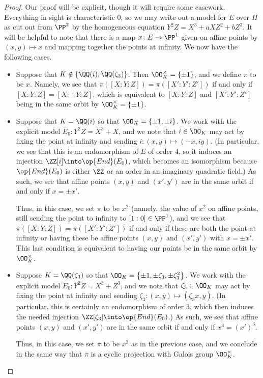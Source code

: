 \documentclass[../notes.tex]{subfiles}
\begin{document}
\begin{proof}
	Our proof will be explicit, though it will require some casework. Everything in sight is characteristic $0$, so we may write out a model for $E$ over $H$ as cut out from $\PP^2$ by the homogeneous equation $Y^2Z=X^3+aXZ^2+bZ^3$. It will be helpful to note that there is a map $x\colon E\to\PP^1$ given on affine points by $(x,y)\mapsto x$ and mapping together the points at infinity. We now have the following cases.
	\begin{itemize}
		\item Suppose that $K\notin\{\QQ(i),\QQ(\zeta_3)\}$. Then $\OO_K^\times=\{\pm1\}$, and we define $\pi$ to be $x$. Namely, we see that $\pi([X:Y:Z])=\pi([X':Y':Z'])$ if and only if $[X:Y:Z]=[X:\pm Y:Z]$, which is equivalent to $[X:Y:Z]$ and $[X':Y':Z']$ being in the same orbit by $\OO_K^\times=\{\pm1\}$.

		\item Suppose that $K=\QQ(i)$ so that $\OO_K=\{\pm1,\pm i\}$. We work with the explicit model $E_0\colon Y^2Z=X^3+X$, and we note that $i\in\OO_K$ may act by fixing the point at infinity and sending $i\colon(x,y)\mapsto(-x,iy)$. (In particular, we see that this is an endomorphism of $E$ of order $4$, so it induces an injection $\ZZ[i]\into\op{End}(E_0)$, which becomes an isomorphism because $\op{End}(E_0)$ is either $\ZZ$ or an order in an imaginary quadratic field.) As such, we see that affine points $(x,y)$ and $(x',y')$ are in the same orbit if and only if $x=\pm x'$.
		
		Thus, in this case, we set $\pi$ to be $x^2$ (namely, the value of $x^2$ on affine points, still sending the point to infinity to $[1:0]\in\PP^1$), and we see that $\pi([X:Y:Z])=\pi([X':Y':Z'])$ if and only if these are both the point at infinity or having these be affine points $(x,y)$ and $(x',y')$ with $x=\pm x'$. This last condition is equivalent to having our points be in the same orbit by $\OO_K^\times$.

		\item Suppose $K=\QQ(\zeta_3)$ so that $\OO_K=\left\{\pm1,\pm\zeta_3,\pm\zeta_3^2\right\}$. We work with the explicit model $E_0\colon Y^2Z=X^3+Z^3$, and we note that $\zeta_3\in\OO_K$ may act by fixing the point at infinity and sending $\zeta_3\colon(x,y)\mapsto(\zeta_3x,y)$. (In particular, this is certainly an endomorphism of order $3$, which then induces the needed injection $\ZZ[\zeta_3]\into\op{End}(E_0)$.) As such, we see that affine points $(x,y)$ and $(x',y')$ are in the same orbit if and only if $x^3=(x')^3$.

		Thus, in this case, we set $\pi$ to be $x^3$ as in the previous case, and we conclude in the same way that $\pi$ is a cyclic projection with Galois group $\OO_K^\times$.
		\qedhere
	\end{itemize}
\end{proof}
\end{document}
